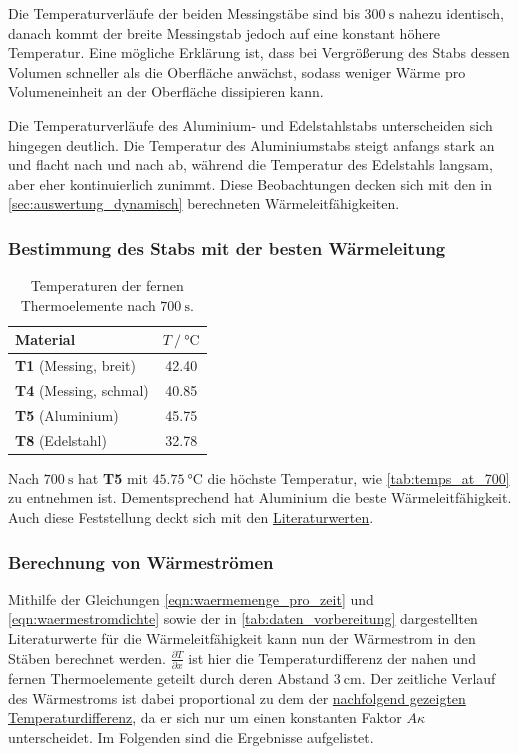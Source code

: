 Die Temperaturverläufe der beiden Messingstäbe sind bis $\SI{300}{\second}$ nahezu identisch,
danach kommt der breite Messingstab jedoch auf eine konstant höhere Temperatur.
Eine mögliche Erklärung ist,
dass bei Vergrößerung des Stabs dessen Volumen schneller als die Oberfläche anwächst,
sodass weniger Wärme pro Volumeneinheit an der Oberfläche dissipieren kann.

Die Temperaturverläufe des Aluminium- und Edelstahlstabs
unterscheiden sich hingegen deutlich.
Die Temperatur des Aluminiumstabs steigt anfangs stark an und flacht nach und nach ab,
während die Temperatur des Edelstahls langsam, aber eher kontinuierlich zunimmt.
Diese Beobachtungen decken sich mit den in \autoref{sec:auswertung_dynamisch} berechneten Wärmeleitfähigkeiten.


\subsubsection{Bestimmung des Stabs mit der besten Wärmeleitung}

\begin{table}[H]
  \centering
  \caption{Temperaturen der fernen Thermoelemente nach $\SI{700}{\second}$.}
  \label{tab:temps_at_700}
  \begin{tabular}{l c}
  \toprule
  Material &
  $T \mathbin{/} \si{\celsius}$ \\
  \midrule
  \textbf{T1} (Messing, breit)  & \num{42.40} \\
  \textbf{T4} (Messing, schmal) & \num{40.85} \\
  \textbf{T5} (Aluminium)       & \num{45.75} \\
  \textbf{T8} (Edelstahl)       & \num{32.78} \\
  \bottomrule
  \end{tabular}
\end{table}

Nach $\SI{700}{\second}$ hat \textbf{T5} mit $\SI{45.75}{\celsius}$ die höchste Temperatur,
wie \autoref{tab:temps_at_700} zu entnehmen ist.
Dementsprechend hat Aluminium die beste Wärmeleitfähigkeit.
Auch diese Feststellung deckt sich mit den \hyperref[tab:daten_vorbereitung]{Literaturwerten}.


\subsubsection{Berechnung von Wärmeströmen}

Mithilfe der Gleichungen \eqref{eqn:waermemenge_pro_zeit} und \eqref{eqn:waermestromdichte}
sowie der in \autoref{tab:daten_vorbereitung} dargestellten Literaturwerte für die Wärmeleitfähigkeit
kann nun der Wärmestrom in den Stäben berechnet werden.
$\frac{\partial T}{\partial x}$ ist hier die Temperaturdifferenz der nahen und fernen Thermoelemente geteilt durch deren Abstand $\SI{3}{\centi\meter}$.
Der zeitliche Verlauf des Wärmestroms ist dabei proportional zu dem der \hyperref[fig:statisch_tdiff]{nachfolgend gezeigten Temperaturdifferenz},
da er sich nur um einen konstanten Faktor $A \kappa$ unterscheidet.
Im Folgenden sind die Ergebnisse aufgelistet.

